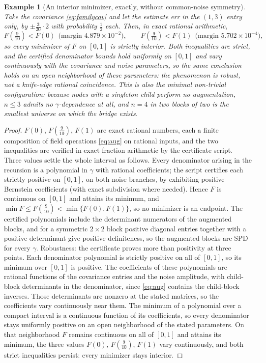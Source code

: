 \documentclass[11pt]{article}
\newtheorem{example}{Example}
\theoremstyle{remark}
\begin{document}
\begin{example}[An interior minimizer, exactly, without common-noise
symmetry]
\label{ex:interior}
Take the covariance \eqref{eq:familycov} and let the estimate err in the
$(1,3)$ entry only, by $\pm \tfrac{3}{20}\cdot 2$ with probability
$\tfrac12$ each. Then, in exact rational arithmetic,
\[
  F(\tfrac{9}{10}) < F(0) \ \ \text{(margin } 4.879\times10^{-2}\text{)},
  \qquad
  F(\tfrac{9}{10}) < F(1) \ \ \text{(margin } 5.702\times10^{-4}\text{)},
\]
so every minimizer of $F$ on $[0,1]$ is strictly interior. Both
inequalities are strict, and the certified denominator bounds hold
uniformly on $[0,1]$ and vary continuously with the covariance and noise
parameters, so the same conclusion holds on an open neighborhood of these
parameters: the phenomenon is robust, not a knife-edge rational
coincidence. This is also the minimal non-trivial
configuration: because nodes with a singleton child perform no
augmentation, $n \le 3$ admits no $\gamma$-dependence at all, and $n = 4$ in
two blocks of two is the smallest universe on which the bridge exists.
\end{example}
\begin{proof}
$F(0)$, $F(\tfrac{9}{10})$, $F(1)$ are exact rational numbers, each a finite
composition of field operations \eqref{eq:aug} on rational inputs, and the
two inequalities are verified in exact fraction arithmetic by the
certificate script. Three values settle the whole interval as follows.
Every denominator arising in the recursion is a polynomial in $\gamma$ with
rational coefficients; the script certifies each strictly positive on
$[0,1]$, on both noise branches, by exhibiting positive Bernstein
coefficients (with exact subdivision where needed). Hence $F$ is continuous
on $[0,1]$ and attains its minimum, and
$\min F \le F(\tfrac{9}{10}) < \min\{F(0), F(1)\}$, so no minimizer is an
endpoint. The certified polynomials include the determinant numerators
of the augmented blocks, and for a symmetric $2 \times 2$ block positive
diagonal entries together with a positive determinant give positive
definiteness, so the augmented blocks are SPD for every $\gamma$. Robustness: the certificate proves
more than positivity at three points. Each denominator polynomial is
strictly positive on all of $[0,1]$, so its minimum over $[0,1]$ is
positive. The coefficients of these polynomials are rational functions of the
covariance entries and the noise amplitude, with child-block determinants
in the denominator, since \eqref{eq:aug} contains the child-block inverses.
Those determinants are nonzero at the stated matrices, so the coefficients
vary continuously near them. The minimum of a polynomial over a compact
interval is a continuous function of its coefficients, so every denominator
stays uniformly positive on an open neighborhood of the stated parameters. On that neighborhood $F$ remains
continuous on all of $[0,1]$ and attains its minimum, the three values
$F(0)$, $F(\tfrac{9}{10})$, $F(1)$ vary continuously, and both strict
inequalities persist: every minimizer stays interior.
\end{proof}
\end{document}
